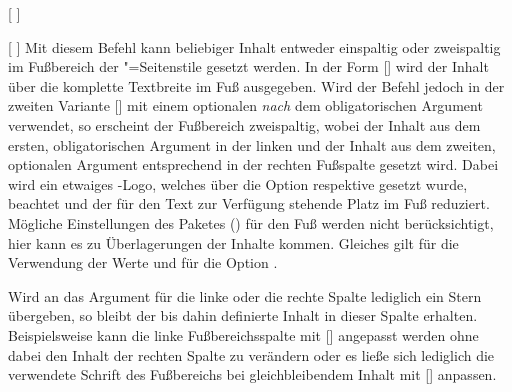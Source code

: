 \begin{Declaration*}{}
\begin{Declaration*}{}
\begin{Declaration*}{}
\begin{Declaration}{%
  [%
  ]%
}
\begin{Declaration}[v2.04]{%
  [%
  ]%
}
\printdeclarationlist%
%
%
Mit diesem Befehl kann beliebiger Inhalt entweder einspaltig oder zweispaltig 
im Fußbereich der "=Seitenstile gesetzt werden. In der 
Form [] wird der Inhalt über die komplette 
Textbreite im Fuß ausgegeben. Wird der Befehl jedoch in der zweiten Variante 
[] mit 
einem optionalen \emph{nach} dem obligatorischen Argument verwendet, so 
erscheint der Fußbereich zweispaltig, wobei der Inhalt aus dem ersten, 
obligatorischen Argument in der linken und der Inhalt aus dem zweiten, 
optionalen Argument entsprechend in der rechten Fußspalte gesetzt wird. Dabei 
wird ein etwaiges \DDC-Logo, welches über die Option  respektive
 gesetzt wurde, beachtet und der für den Text zur Verfügung 
stehende Platz im Fuß reduziert. Mögliche Einstellungen des Paketes  
() für den Fuß werden nicht 
berücksichtigt, hier kann es zu Überlagerungen der Inhalte kommen. Gleiches 
gilt für die Verwendung der Werte  und  für die 
Option .

Wird an das Argument für die linke oder die rechte Spalte lediglich ein Stern 
\PValue{*} übergeben, so bleibt der bis dahin definierte Inhalt in dieser 
Spalte erhalten. Beispielsweise kann die linke Fußbereichsspalte mit 
[\POParameter{*}] angepasst werden ohne 
dabei den Inhalt der rechten Spalte zu verändern oder es ließe sich lediglich 
die verwendete Schrift des Fußbereichs bei gleichbleibendem Inhalt mit 
[\PParameter{*}\POParameter{*}]%
anpassen.


\end{Declaration}
\end{Declaration}
\end{Declaration*}
\end{Declaration*}
\end{Declaration*}

